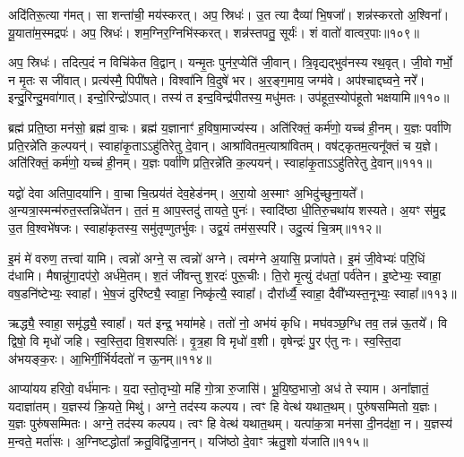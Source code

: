 अदि॑तिरू॒त्या ग॑मत्।
सा शन्ता॑ची॒ मय॑स्करत्।
अप॒ स्रिधः॑।
उ॒त त्या दैव्या॑ भि॒षजा᳚।
शन्न॑स्करतो अ॒श्विना᳚।
यू॒याता॑म॒स्मद्रपः॑।
अप॒ स्रिधः॑।
शम॒ग्निर॒ग्निभि॑स्करत्।
शन्न॑स्तपतु॒ सूर्यः॑।
शं वातो॑ वात्वर॒पाः॥१०९॥

अप॒ स्रिधः॑।
तदित्प॒दं न विचि॑केत वि॒द्वान्।
यन्मृ॒तः पुन॑र॒प्येति॑ जी॒वान्।
त्रि॒वृद्यद्भुव॑नस्य रथ॒वृत्।
जी॒वो गर्भो॒ न मृ॒तः स जी॑वात्।
प्रत्य॑स्मै॒ पिपी॑षते।
विश्वा॑नि वि॒दुषे॑ भर।
अ॒र॒ङ्ग॒माय॒ जग्म॑वे।
अप॑श्चाद्दघ्वने॒ नरे᳚।
इन्दु॒रिन्दु॒मवा॑गात्।
इन्दो॒रिन्द्रो॑\-ऽपात्।
तस्य॑ त इन्द॒विन्द्र॑पीतस्य॒ मधु॑मतः।
उप॑हूत॒स्योप॑हूतो भक्षयामि॥११०॥\anuvakamend[उ॒द॒र्॒ष इ॑न्द्रि॒येण॒ गा म॒तिर॑र॒पा अ॑गा॒त्रीणि॑ च]

ब्रह्म॑ प्रति॒ष्ठा मन॑सो॒ ब्रह्म॑ वा॒चः।
ब्रह्म॑ य॒ज्ञानाꣳ॑ ह॒विषा॒माज्य॑स्य।
अति॑रिक्तं॒ कर्म॑णो॒ यच्च॑ ही॒नम्।
य॒ज्ञः पर्वा॑णि प्रति॒रन्ने॑ति क॒ल्पयन्॑।
स्वाहा॑कृ॒ता\-ऽऽहु॑तिरेतु दे॒वान्।
आश्रा॑वितम॒त्याश्रा॑वितम्।
वष॑ट्कृतम॒त्यनू᳚क्तं च य॒ज्ञे।
अति॑रिक्तं॒ कर्म॑णो॒ यच्च॑ ही॒नम्।
य॒ज्ञः पर्वा॑णि प्रति॒रन्ने॑ति क॒ल्पयन्॑।
स्वाहा॑कृ॒ता\-ऽऽहु॑तिरेतु दे॒वान्॥१११॥

यद्वो॑ देवा अतिपा॒दया॑नि।
वा॒चा चि॒त्प्रय॑तं देव॒हेड॑नम्।
अ॒रा॒यो अ॒स्माꣳ अ॒भिदु॑च्छुना॒यते᳚।
अ॒न्यत्रा॒स्मन्म॑रुत॒स्तन्निधे॑\-तन।
त॒तं म॒ आप॒स्तदु॑ तायते॒ पुनः॑।
स्वादि॑ष्ठा धी॒तिरु॒चथा॑य शस्यते।
अ॒यꣳ स॑मु॒द्र उ॒त वि॒श्वभे॑षजः।
स्वाहा॑कृतस्य॒ समु॑तृप्णुतर्भुवः।
उद्व॒यं तम॑स॒स्परि॑।
उदु॒त्यं चि॒त्रम्॥११२॥

इ॒मं मे॑ वरुण॒ तत्त्वा॑ यामि।
त्वन्नो॑ अग्ने॒ स त्वन्नो॑ अग्ने।
त्वम॑ग्ने अ॒यासि॒ प्रजा॑पते।
इ॒मं जी॒वेभ्यः॑ परि॒धिं द॑धामि।
मैषान्नु॑गा॒दप॑रो॒ अर्ध॑मे॒तम्।
श॒तं जी॑वन्तु श॒रदः॑ पुरू॒चीः।
ति॒रो मृ॒त्युं द॑धतां॒ पर्व॑तेन।
इ॒ष्टेभ्यः॒ स्वाहा॒ वष॒डनि॑ष्टेभ्यः॒ स्वाहा᳚।
भे॒ष॒जं दुरि॑ष्ट्यै॒ स्वाहा॒ निष्कृ॑त्यै॒ स्वाहा᳚।
दौरा᳚र्ध्यै॒ स्वाहा॒ दैवी᳚भ्यस्त॒नूभ्यः॒ स्वाहा᳚॥११३॥

ऋद्ध्यै॒ स्वाहा॒ समृ॑द्ध्यै॒ स्वाहा᳚।
यत॑ इन्द्र॒ भया॑महे।
ततो॑ नो॒ अभ॑यं कृधि।
मघ॑वञ्छ॒ग्धि तव॒ तन्न॑ ऊ॒तये᳚।
वि द्विषो॒ वि मृधो॑ जहि।
स्व॒स्ति॒दा वि॒शस्पतिः॑।
वृ॒त्र॒हा वि मृधो॑ व॒शी।
वृषेन्द्रः॑ पु॒र ए॑तु नः।
स्व॒स्ति॒दा अ॑भयङ्क॒रः।
आ॒भिर्गी॒र्भिर्यदतो॑ न ऊ॒नम्॥११४॥

आप्या॑यय हरिवो॒ वर्ध॑मानः।
य॒दा स्तो॒तृभ्यो॒ महि॑ गो॒त्रा रु॒जासि॑।
भू॒यि॒ष्ठ॒भाजो॒ अध॑ ते स्याम।
अना᳚ज्ञातं॒ यदाज्ञा॑तम्।
य॒ज्ञस्य॑ क्रि॒यते॒ मिथु॑।
अग्ने॒ तद॑स्य कल्पय।
त्वꣳ हि वेत्थ॑ यथात॒थम्।
पुरु॑षसम्मितो य॒ज्ञः।
य॒ज्ञः पुरु॑षसम्मितः।
अग्ने॒ तद॑स्य कल्पय।
त्वꣳ हि वेत्थ॑ यथात॒थम्।
यत्पा॑क॒त्रा मन॑सा दी॒नद॑क्षा॒ न।
य॒ज्ञस्य॑ म॒न्वते॒ मर्ता॑सः।
अ॒ग्निष्टद्धोता᳚ क्रतु॒विद्वि॑जा॒नन्।
यजि॑ष्ठो दे॒वाꣳ ऋ॑तु॒शो य॑जाति॥११५॥\anuvakamend[दे॒वाꣴश्चि॒त्रं त॒नूभ्यः॒ स्वाहो॒नं पुरु॑षसम्मि॒तो\-ऽग्ने॒ तद॑स्य कल्पय॒ पञ्च॑ च]

